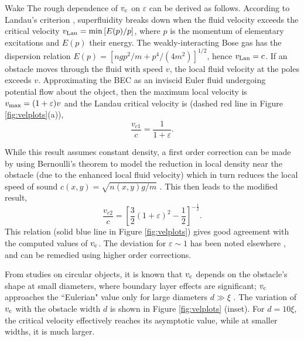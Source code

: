 \begin{chapter}{\label{cha:wake}Wake}
The rough dependence of $v_{\rm c}$ on $\varepsilon$ can be derived as follows.   According to Landau's criterion \cite{NozieresPines},  superfluidity breaks down when the fluid velocity exceeds the critical velocity $v_{\rm Lan}=\min \left[E(p)/p\right]$, where $p$ is the momentum of elementary excitations and $E(p)$ their energy.   The weakly-interacting Bose gas has the dispersion relation $E(p)=[ngp^2/m + p^4/(4m^2)]^{1/2}$, hence $v_{\rm Lan}=c$.  If an obstacle moves through the fluid with speed $v$, the local fluid velocity at the poles exceeds $v$. Approximating the BEC as an inviscid Euler fluid undergoing potential flow about the object, then the maximum local velocity is $v_{\rm max}=(1+\varepsilon)v$ and the Landau critical velocity is (dashed red line in Figure \ref{fig:velplots}(a)),
\begin{equation}
\frac{v_{c1}}{c} = \frac{1}{1+\varepsilon}.
\label{eq:crit1}
\end{equation}

While this result assumes constant density, a first order correction can be made by using Bernoulli's theorem to model the reduction in local density near the obstacle (due to the enhanced local fluid velocity) which in turn reduces the local speed of sound $c(x,y)=\sqrt{n(x,y)g/m}$ \cite{win01}.  This then leads to the modified result,
\begin{equation}
\frac{v_{c2}}{c} = \left [\frac{3}{2}(1+\varepsilon)^2 - \frac{1}{2}\right]^{-\frac{1}{2}}.
\label{eq:crit2}
\end{equation}
This relation (solid blue line in Figure \ref{fig:velplots}) gives good agreement with the computed values of $v_{\rm c}$.  The deviation for $\varepsilon \sim 1$ has been noted elsewhere \cite{rica2001}, and can be remedied using higher order corrections.

From studies on circular objects, it is known that $v_{\rm c}$ depends on the obstacle's shape at small diameters, where boundary layer effects are significant; $v_{\rm c}$ approaches the ``Eulerian" value only for large diameters $d \gg \xi$ \cite{huepe00,rica2001}.  The variation of $v_{\rm c}$ with the obstacle width $d$ is shown in Figure \ref{fig:velplots} (inset).  For $d=10\xi$, the critical velocity effectively reaches its asymptotic value, while at smaller widths, it is much larger.    


\end{chapter}
